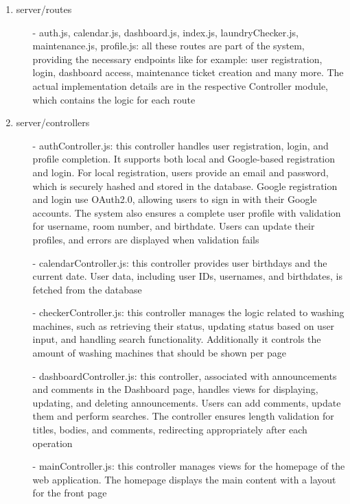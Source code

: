 \documentclass[conference]{IEEEtran}
\begin{document}
\begin{enumerate}
\begin{enumerate}
        \item server/routes
        \begin{itemize}
            \item[-] auth.js, calendar.js, dashboard.js, index.js, laundryChecker.js, maintenance.js, profile.js: all these routes are part of the system, providing the necessary endpoints like for example: user registration, login, dashboard access, maintenance ticket creation and many more. The actual implementation details are in the respective Controller module, which contains the logic for each route
        \end{itemize}

        \item server/controllers
        \begin{itemize}
            \item[-] authController.js: this controller handles user registration, login, and profile completion. It supports both local and Google-based registration and login. For local registration, users provide an email and password, which is securely hashed and stored in the database. Google registration and login use OAuth2.0, allowing users to sign in with their Google accounts. The system also ensures a complete user profile with validation for username, room number, and birthdate. Users can update their profiles, and errors are displayed when validation fails
            \item[-] calendarController.js: this controller provides user birthdays and the current date. User data, including user IDs, usernames, and birthdates, is fetched from the database
            \item[-] checkerController.js: this controller manages the logic related to washing machines, such as retrieving their status, updating status based on user input, and handling search functionality. Additionally it controls the amount of washing machines that should be shown per page
            \item[-] dashboardController.js: this controller, associated with announcements and comments in the Dashboard page, handles views for displaying, updating, and deleting announcements. Users can add comments, update them and perform searches. The controller ensures length validation for titles, bodies, and comments, redirecting appropriately after each operation
            \item[-] mainController.js: this controller manages views for the homepage of the web application. The homepage displays the main content with a layout for the front page

\end{itemize}
\end{enumerate}
\end{enumerate}
\end{document}
